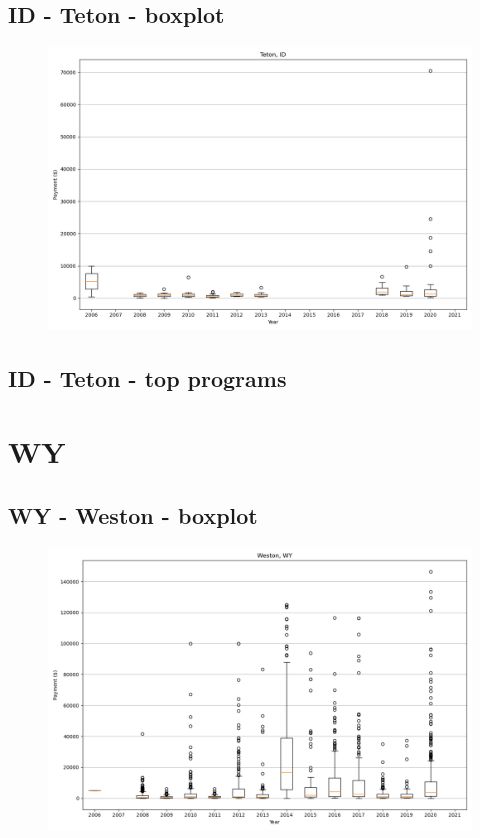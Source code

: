 \subsection*{ID - Teton - boxplot}
\begin{figure}[h]
\centering
\includegraphics[width=7in]{../output/boxplots/counties/Teton-ID_boxplot.png}
\end{figure}


\subsection*{ID - Teton - top programs}

\newpage
\section*{WY}
\subsection*{WY - Weston - boxplot}
\begin{figure}[h]
\centering
\includegraphics[width=7in]{../output/boxplots/counties/Weston-WY_boxplot.png}
\end{figure}


